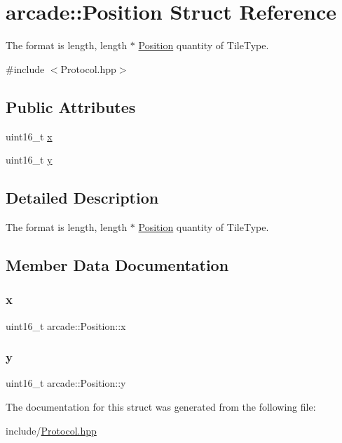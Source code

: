 \hypertarget{structarcade_1_1_position}{}\section{arcade\+:\+:Position Struct Reference}
\label{structarcade_1_1_position}


The format is length, length $\ast$ \hyperlink{structarcade_1_1_position}{Position} quantity of Tile\+Type.  




{\ttfamily \#include $<$Protocol.\+hpp$>$}

\subsection*{Public Attributes}
\begin{DoxyCompactItemize}
\item 
uint16\+\_\+t \hyperlink{structarcade_1_1_position_a287e9cb10b120d19d35ad5960dd4cb4b}{x}
\item 
uint16\+\_\+t \hyperlink{structarcade_1_1_position_a1690c4c77c4ef4b9717565f43b652348}{y}
\end{DoxyCompactItemize}


\subsection{Detailed Description}
The format is length, length $\ast$ \hyperlink{structarcade_1_1_position}{Position} quantity of Tile\+Type. 

\subsection{Member Data Documentation}
\mbox{\label{structarcade_1_1_position_a287e9cb10b120d19d35ad5960dd4cb4b}} 
\subsubsection{\texorpdfstring{x}{x}}
{\footnotesize\ttfamily uint16\+\_\+t arcade\+::\+Position\+::x}

\mbox{\label{structarcade_1_1_position_a1690c4c77c4ef4b9717565f43b652348}} 
\subsubsection{\texorpdfstring{y}{y}}
{\footnotesize\ttfamily uint16\+\_\+t arcade\+::\+Position\+::y}



The documentation for this struct was generated from the following file\+:\begin{DoxyCompactItemize}
\item 
include/\hyperlink{include_2_protocol_8hpp}{Protocol.\+hpp}\end{DoxyCompactItemize}
